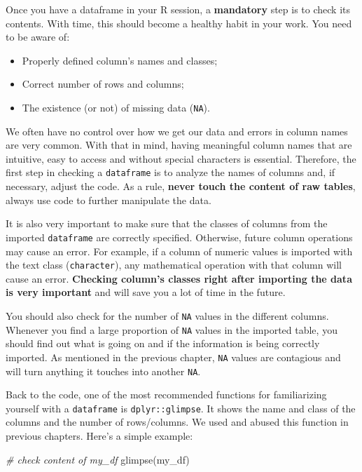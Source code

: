 \documentclass[
  12pt,
]{book}
\newenvironment{Shaded}{\begin{snugshade}}{\end{snugshade}}
\newcommand{\CommentTok}[1]{\textcolor[rgb]{0.37,0.37,0.37}{\textit{#1}}}
\newcommand{\FunctionTok}[1]{\textcolor[rgb]{0,0,0}{#1}}
\newcommand{\NormalTok}[1]{#1}
\providecommand{\tightlist}{%
  \setlength{\itemsep}{0pt}\setlength{\parskip}{0pt}}
\begin{document}
Once you have a dataframe in your R session, a \textbf{mandatory} step is to check its contents. With time, this should become a healthy habit in your work. You need to be aware of:

\begin{itemize}
\tightlist
\item
  Properly defined column's names and classes;
\item
  Correct number of rows and columns;
\item
  The existence (or not) of missing data (\texttt{NA}).
\end{itemize}

We often have no control over how we get our data and errors in column names are very common. With that in mind, having meaningful column names that are intuitive, easy to access and without special characters is essential. Therefore, the first step in checking a \texttt{dataframe} is to analyze the names of columns and, if necessary, adjust the code. As a rule, \textbf{never touch the content of raw tables}, always use code to further manipulate the data.

It is also very important to make sure that the classes of columns from the imported \texttt{dataframe} are correctly specified. Otherwise, future column operations may cause an error. For example, if a column of numeric values is imported with the text class (\texttt{character}), any mathematical operation with that column will cause an error. \textbf{Checking column's classes right after importing the data is very important} and will save you a lot of time in the future.

You should also check for the number of \texttt{NA} values in the different columns. Whenever you find a large proportion of \texttt{NA} values in the imported table, you should find out what is going on and if the information is being correctly imported. As mentioned in the previous chapter, \texttt{NA} values are contagious and will turn anything it touches into another \texttt{NA}.

Back to the code, one of the most recommended functions for familiarizing yourself with a \texttt{dataframe} is \texttt{dplyr::glimpse}. It shows the name and class of the columns and the number of rows/columns. We used and abused this function in previous chapters. Here's a simple example:

\begin{Shaded}
\begin{Highlighting}[]
\CommentTok{\# check content of my\_df}
\FunctionTok{glimpse}\NormalTok{(my\_df)}
\end{Highlighting}
\end{Shaded}
\end{document}
